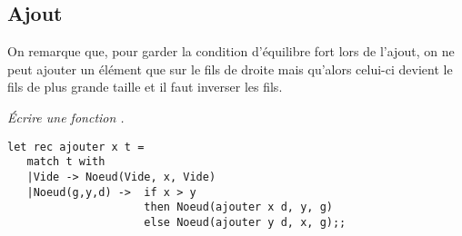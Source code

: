 \subsection*{Ajout}
On remarque que, pour garder la condition d'équilibre fort lors de l'ajout, on ne peut ajouter un élément que sur le fils de droite mais qu'alors celui-ci devient le fils de plus grande taille et il faut inverser les fils.
\begin{Exercise}[title = Ajouter]\it 
Écrire une fonction .
\end{Exercise}
\begin{Answer}
\begin{lstlisting}
let rec ajouter x t =
   match t with
   |Vide -> Noeud(Vide, x, Vide)
   |Noeud(g,y,d) ->  if x > y
                     then Noeud(ajouter x d, y, g)
                     else Noeud(ajouter y d, x, g);;
\end{lstlisting}
\end{Answer}
